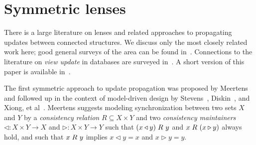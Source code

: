 %
%

\section{Symmetric lenses}
\newif \iftext  \texttrue
\newif \iffull  \fulltrue
\newif \ifdraft \draftfalse
\newif \ifdelta \deltafalse
\newif \iflater \laterfalse  %

\newif \iftikz  \tikztrue
There is a large literature on lenses and related approaches to
propagating updates between connected structures.  We discuss only the most
closely related work here; good general surveys of the area can be found
in~\cite{DBLP:conf/icmt/CzarneckiFHLST09,FosterThesis}.  Connections to the
literature on {\em view update} in databases are surveyed
in~\cite{Focal2005-shortcite}. \iffull A short version of this paper is available
in~\cite{HofmannPierceWagner10}.\fi

The first symmetric approach to update propagation was proposed by
Meertens~\cite{Meertens98} and followed up \iffull in the context of
model-driven design \fi by Stevens~\cite{Stevens07},
Diskin~\cite{DBLP:conf/models/Diskin08}, and Xiong, et
al~\cite{xiong2009supporting}.
%
Meertens suggests modeling synchronization between two sets
$X$ and $Y$ by a {\em consistency relation} $R\subseteq
X\times Y$ and two {\em consistency maintainers}
$\triangleleft: X\times Y\rightarrow X$ and $\triangleright: X\times Y
\rightarrow Y$ such that $(x\triangleleft y) \mathrel{R_{}} y$ and
$x \mathrel{R_{}} (x\triangleright y)$ always hold, and such that $x \mathrel{R_{}} y$ implies
$x \triangleleft y = x$ and $x \triangleright y = y$.

